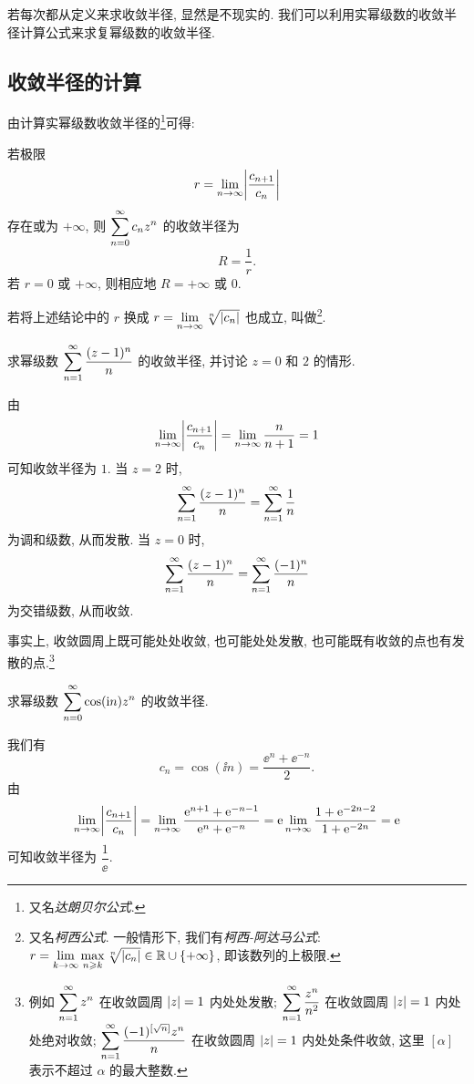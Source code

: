 若每次都从定义来求收敛半径, 显然是不现实的.
我们可以利用实幂级数的收敛半径计算公式来求复幂级数的收敛半径.


\subsection{收敛半径的计算}

由计算实幂级数收敛半径的\footnote{又名\emph{达朗贝尔公式}.}可得:
\begin{theorem}
  若极限
  \[
    r=\lim_{n\rightarrow\infty}\biggl\vert\frac{c_{n+1}}{c_n}\biggr\vert
  \]
  存在或为 $+\infty$, 则 $\displaystyle\sum_{n=0}^{\infty} c_nz^n$ 的收敛半径为
  \[
    R=\dfrac1r.
  \]
  若 $r=0$ 或 $+\infty$, 则相应地 $R=+\infty$ 或 $0$.
\end{theorem}

若将上述结论中的 $r$ 换成 \alert{$r=\lim\limits_{n\rightarrow\infty}\sqrt[n]{\lvert c_n\rvert}$} 也成立, 叫做\footnote{
  又名\emph{柯西公式}.
  一般情形下, 我们有\emph{柯西-阿达马公式}: 
  $r=\lim\limits_{k\rightarrow\infty}\max\limits_{n\geqslant k}\sqrt[n]{\lvert c_n\rvert}\in{\mathbb{R}}\cup\{+\infty\}$, 即该数列的上极限.
}.

\begin{example}
  求幂级数 $\displaystyle\sum_{n=1}^{\infty} \frac{(z-1)^n}n$ 的收敛半径, 并讨论 $z=0$ 和 $2$ 的情形.
\end{example}

\begin{solution}
  由
  \[
     \lim_{n\rightarrow\infty}\biggl\vert\frac{c_{n+1}}{c_n}\biggr\vert
    =\lim_{n\rightarrow\infty}\frac n{n+1}=1
  \]
  可知收敛半径为 $1$.
  当 $z=2$ 时,
  \[
    \displaystyle\sum_{n=1}^{\infty} \frac{(z-1)^n}n=\displaystyle\sum_{n=1}^{\infty} \frac1n
  \]
  为调和级数, 从而发散.
  当 $z=0$ 时,
  \[
    \displaystyle\sum_{n=1}^{\infty} \frac{(z-1)^n}n=\displaystyle\sum_{n=1}^{\infty} \frac{(-1)^n}n
  \]
  为交错级数, 从而收敛.
\end{solution}

事实上, \alert{收敛圆周上既可能处处收敛, 也可能处处发散, 也可能既有收敛的点也有发散的点}.\footnote{
  例如 $\displaystyle\sum_{n=1}^{\infty} z^n$ 在收敛圆周 $\lvert z\rvert=1$ 内处处发散; $\displaystyle\sum_{n=1}^{\infty} \dfrac{z^n}{n^2}$ 在收敛圆周 $\lvert z\rvert=1$ 内处处绝对收敛; $\displaystyle\sum_{n=1}^{\infty} \dfrac{(-1)^{[\sqrt n]}z^n}{n}$ 在收敛圆周 $\lvert z\rvert=1$ 内处处条件收敛, 这里 $[\alpha]$ 表示不超过 $\alpha$ 的最大整数.
}

\begin{example}
  求幂级数 $\displaystyle\sum_{n=0}^{\infty} \cos(\mathrm{i} n)z^n$ 的收敛半径.
\end{example}

\begin{solution}
  我们有
  \[
    c_n=\cos(\ii n)=\dfrac{\ee^n+\ee^{-n}}2.
  \]
  由
  \[
     \lim_{n\rightarrow\infty}\biggl\vert\frac{c_{n+1}}{c_n}\biggr\vert
    =\lim_{n\rightarrow\infty}\frac{\mathrm{e}^{n+1}+\mathrm{e}^{-n-1}}{\mathrm{e}^n+\mathrm{e}^{-n}}
    =\mathrm{e}\lim_{n\rightarrow\infty}\frac{1+\mathrm{e}^{-2n-2}}{1+\mathrm{e}^{-2n}}
    =\mathrm{e}
  \]
  可知收敛半径为 $\dfrac1\ee$.
\end{solution}

